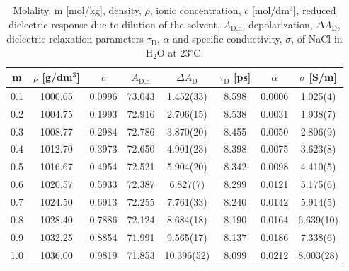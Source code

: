 \begin{table}[!ht]
	\centering
	\caption{Molality, m [mol/kg], density, $\rho$, ionic concentration, $c$ [mol/dm$^3$], reduced dielectric response due to dilution of the solvent, $A_\text{D,n}$, depolarization, $\Delta A_\text{D}$, dielectric relaxation parameters $\tau_\text{D}$, $\alpha$ and specific conductivity, $\sigma$, of NaCl in H$_2$O at 23$^\circ$C.}
	\label{my-label}
	\begin{tabular}{cccccccc}
		\hline
		m & $\rho$ [g/dm$^3$] & $c$ & $A_\text{D,n}$ & $\Delta A_\text{D}$ & $\tau_\text{D}$ [ps] & $\alpha$ & $\sigma$ [S/m] \\
		\hline
		0.1 & 1000.65   & 0.0996 & 73.043   & 1.452(33)      & 8.598    & 0.0006 & 1.025(4)  \\
		0.2 & 1004.75   & 0.1993 & 72.916   & 2.706(15)      & 8.538    & 0.0031 & 1.938(7)  \\
		0.3 & 1008.77   & 0.2984 & 72.786   & 3.870(20)      & 8.455    & 0.0050 & 2.806(9)  \\
		0.4 & 1012.70   & 0.3973 & 72.650   & 4.901(23)      & 8.398    & 0.0075 & 3.623(8)  \\
		0.5 & 1016.67   & 0.4954 & 72.521   & 5.904(20)      & 8.342    & 0.0098 & 4.410(5)  \\
		0.6 & 1020.57   & 0.5933 & 72.387   & 6.827(7)       & 8.299    & 0.0121 & 5.175(6)  \\
		0.7 & 1024.50   & 0.6913 & 72.255   & 7.761(33)      & 8.240    & 0.0142 & 5.914(5)  \\
		0.8 & 1028.40   & 0.7886 & 72.124   & 8.684(18)      & 8.190    & 0.0164 & 6.639(10) \\
		0.9 & 1032.25   & 0.8854 & 71.991   & 9.565(17)      & 8.137    & 0.0186 & 7.338(6)  \\
		1.0 & 1036.00   & 0.9819 & 71.853   & 10.396(52)     & 8.099    & 0.0212 & 8.003(28) \\
		\hline
	\end{tabular}
\end{table}


